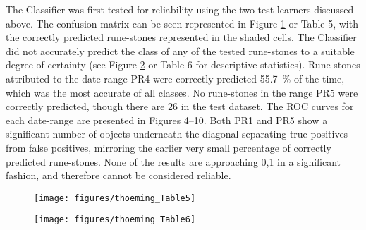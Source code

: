 
The Classifier was first tested for reliability using the two test-learners discussed above. The confusion matrix can be seen represented in Figure \ref{fig:Table5} or Table 5, with the correctly predicted rune-stones represented in the shaded cells. The Classifier did not accurately predict the class of any of the tested rune-stones to a suitable degree of certainty (see Figure \ref{fig:Table6} or Table 6 for descriptive statistics). Rune-stones attributed to the date-range PR4 were correctly predicted \SI{55.7}{\percent} of the time, which was the most accurate of all classes. No rune-stones in the range PR5 were correctly predicted, though there are 26 in the test dataset. 
The ROC curves for each date-range are presented in Figures 4--10. Both PR1 and PR5 show a significant number of objects underneath the diagonal separating true positives from false positives, mirroring the earlier very small percentage of correctly predicted rune-stones. None of the results are approaching 0,1 in a significant fashion, and therefore cannot be considered reliable.

\begin{figure}[!htb]
	\texttt{[image: figures/thoeming\_Table5]}
	\centering
	\label{fig:Table5}
\end{figure}

\begin{figure}[!htb]
	\texttt{[image: figures/thoeming\_Table6]}
	\centering
	\label{fig:Table6}
\end{figure}

